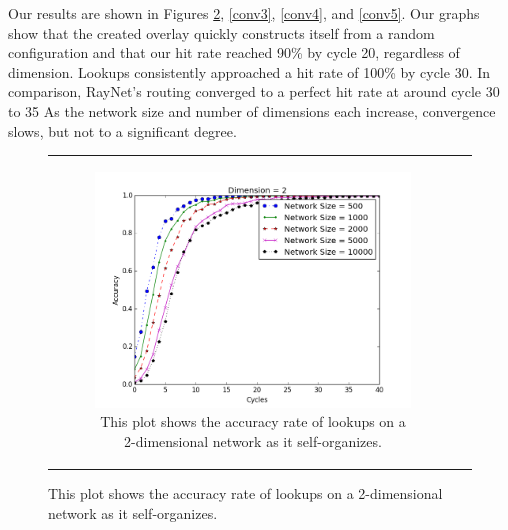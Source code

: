 \documentclass[11pt, conference, letterpaper]{IEEEtran}
\begin{document}
Our results are shown in Figures \ref{conv2}, \ref{conv3}, \ref{conv4}, and \ref{conv5}.
Our graphs show that the created overlay quickly constructs itself from a random configuration and that our hit rate reached 90\% by cycle 20, regardless of dimension.
Lookups consistently approached a hit rate of 100\% by cycle 30. 
In comparison, RayNet's routing converged to a perfect hit rate at around cycle 30 to 35 \cite{raynet} 
As the network size and number of dimensions each increase, convergence slows, but not to a significant degree.

\begin{figure}
	\centering 
	\begin{tabular}{cc}
		
		\begin{subfigure}{\columnwidth}
			\includegraphics[width=\columnwidth]{conv_d2}
			\caption{This plot shows the accuracy rate of lookups on a 2-dimensional network as it self-organizes.}
			\label{conv2}
		\end{subfigure} &
		

\end{tabular}
\end{figure}
\end{document}
